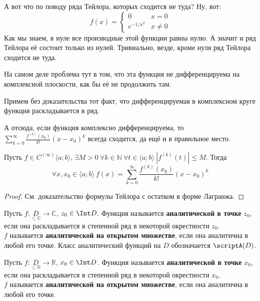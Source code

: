 \documentclass{article}
\begin{document}
    \begin{example}
        А вот что по поводу ряда Тейлора, которых сходится не туда? Ну, вот:
        $$
        f(x)=\begin{cases}
            0 & x=0\\
            e^{-1/x^2} & x\neq0
        \end{cases}
        $$
        Как мы знаем, в нуле все производные этой функции равны нулю. А значит и ряд Тейлора её состоит только из нулей. Тривиально, везде, кроме нуля ряд Тейлора сходится не туда.
    \end{example}
    \begin{remark}
        На самом деле проблема тут в том, что эта функция не дифференцируема на комплексной плоскости, как бы её не продолжить там.
    \end{remark}
    \begin{claim}
        Примем без доказательства тот факт, что дифференцируемая в комплексном круге функция раскладывается в ряд.
    \end{claim}
    \begin{corollary}
        А отсюда, если функция комплексно дифференцируема, то $\sum\limits_{k=0}^\infty\frac{f^{(k)}(x_0)}{k!}(x-x_0)^k$ всегда сходится, да ещё и в правильное место.
    \end{corollary}
    \begin{theorem}
        Пусть $f\in C^{(\infty)}\langle a;b\rangle$, $\exists M>0~\forall k\in\mathbb N~\forall t\in\langle a;b\rangle~|f^{(k)}(t)|\leqslant M$. Тогда
        $$
        \forall x,x_0\in\langle a;b\rangle~f(x)=\sum\limits_{k=0}^\infty\frac{f^{(k)}(x_0)}{k!}(x-x_0)^k
        $$
    \end{theorem}
    \begin{proof}
        См. доказательство формулы Тейлора с остатком в форме Лагранжа.
    \end{proof}
    \begin{definition}
        Пусть $f\colon\underset{\subset\mathbb C}D\to\mathbb C$, $z_0\in\Int D$. Функция называется \textbf{аналитической в точке} $z_0$, если она раскладывается в степенной ряд в некоторой окрестности $z_0$.\\
        $f$ называется \textbf{аналитической на открытом множестве}, если она аналитична в любой его точке. Класс аналитический функций на $D$ обозначается $\scriptA(D)$.
    \end{definition}
    \begin{definition}
        Пусть $f\colon\underset{\subset\mathbb R}D\to\mathbb R$, $x_0\in\Int D$. Функция называется \textbf{аналитической в точке} $x_0$, если она раскладывается в степенной ряд в некоторой окрестности $x_0$.\\
        $f$ называется \textbf{аналитической на открытом множестве}, если она аналитична в любой его точке.
    \end{definition}
\end{document}
